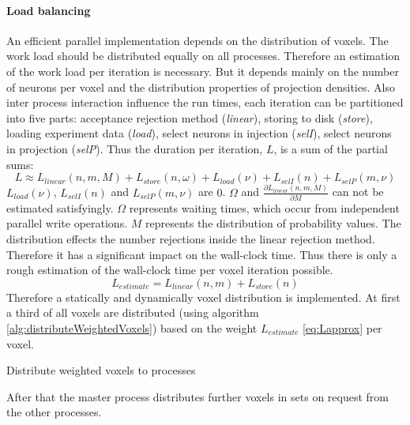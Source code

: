 \paragraph{Load balancing}
\label{par:loadbalancing}
An efficient parallel implementation depends on the distribution of voxels.
The work load should be distributed equally on all processes.
Therefore an estimation of the work load per iteration is necessary.
But it depends mainly on the number of neurons per voxel and the distribution properties of projection densities.
Also inter process interaction influence the run times,
each iteration can be partitioned into five parts: acceptance rejection method (\emph{linear}), storing to disk (\emph{store}),
loading experiment data (\emph{load}), select neurons in injection (\emph{selI}), select neurons in projection (\emph{selP}).
Thus the duration per iteration, $L$, is a sum of the partial sums:
\begin{equation} \label{eq:L}
	L \approx L_{linear}(n,m,M) + L_{store}(n,\omega) + L_{load}(\nu) + L_{selI}(n) + L_{selP}(m,\nu)
\end{equation}
$L_{load}(\nu)$, $L_{selI}(n)$ and $L_{selP}(m,\nu)$ are $0$.
$\Omega$ and $\frac{\partial L_{linear}(n,m,M)}{\partial M}$  can not be estimated satisfyingly.
$\Omega$ represents waiting times, which occur from independent parallel write operations.
$M$ represents the distribution of probability values.
The distribution effects the number rejections inside the linear rejection method.
Therefore it has a significant impact on the wall-clock time.
Thus there is only a rough estimation of the wall-clock time per voxel iteration possible.
\begin{equation} \label{eq:Lapprox}
	L_{estimate} = L_{linear}(n,m) + L_{store}(n)
\end{equation}
Therefore a statically and dynamically voxel distribution is implemented.
At first a third of all voxels are distributed (using algorithm \ref{alg:distributeWeightedVoxels}) based on the weight $L_{estimate}$ \ref{eq:Lapprox}  per voxel.
\begin{algorithm}[ht!]
\caption{Distribute weighted voxels to processes}
\label{alg:distributeWeightedVoxels}
\end{algorithm}
After that the master process distributes further voxels in sets on request from the other processes.

